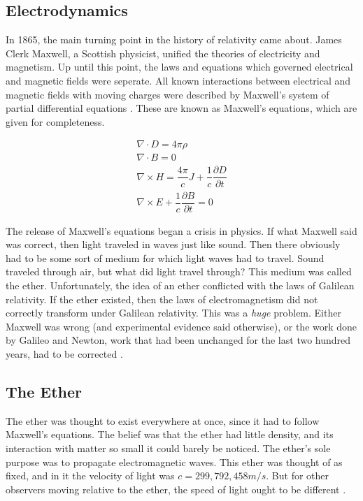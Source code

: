 \documentclass[12pt]{article}
\theoremstyle{defn}
\theoremstyle{pf}
\newcommand{\0}{\emptyset}
\renewcommand{\-}{\setminus}
\begin{document}
\subsection{Electrodynamics}
In 1865, the main turning point in the history of relativity came about. James Clerk Maxwell, a Scottish physicist, unified the theories of electricity and magnetism. Up until this point, the laws and equations which governed electrical and magnetic fields were seperate. All known interactions between electrical and magnetic fields with moving charges were described by Maxwell's system of partial differential equations \cite{hawking}. These are known as Maxwell's equations, which are given for completeness.
 
 
 
\begin{eqnarray*}
\nabla\cdot D=4\pi\rho\\
\nabla\cdot B=0\\
\nabla\times H=\dfrac{4\pi}{c}J+\dfrac{1}{c}\dfrac{\partial D}{\partial t}\\
\nabla\times E+\dfrac{1}{c}\dfrac{\partial B}{\partial t}=0
\end{eqnarray*}

The release of Maxwell's equations began a crisis in physics. If what Maxwell said was correct, then light traveled in waves just like sound. Then there obviously had to be some sort of medium for which light waves had to travel. Sound traveled through air, but what did light travel through? This medium was called the ether. 
Unfortunately, the idea of an ether conflicted with the laws of Galilean relativity. If the ether existed, then the laws of electromagnetism did not correctly transform under Galilean relativity. This was a \textit{huge} problem. Either Maxwell was wrong (and experimental evidence said otherwise), or the work done by Galileo and Newton, work that had been unchanged for the last two hundred years, had to be corrected \cite{jackson}. 

\subsection{The Ether}
The ether was thought to exist everywhere at once, since it had to follow Maxwell's equations. The belief was that the ether had little density, and its interaction with matter so small it could barely be noticed. The ether's sole purpose was to propagate electromagnetic waves. This ether was thought of as fixed, and in it the velocity of light was $c=299,792,458 m/s$. But for other observers moving relative to the ether, the speed of light ought to be different \cite{jackson}.
\end{document}
